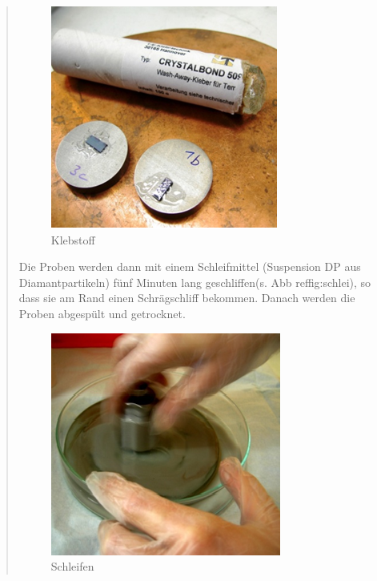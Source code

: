 \begin{quote}
    		\begin{figure}[H]
				\hspace{4.1 cm}
                  \includegraphics[scale=1, trim = 0cm 0cm 0cm 0cm,clip]
                	{./HerstellungBilder/KlebstoffunddieProben.png}
                  \caption{Klebstoff}
                \label{fig:kleb}
            \end{figure}

    		\vspace{2em}

    		Die Proben werden dann mit einem Schleifmittel (Suspension DP aus
    		Diamantpartikeln) fünf Minuten lang geschliffen(s.
    		Abb ref{fig:schlei}), so dass sie am Rand einen Schrägschliff
    		bekommen. Danach werden die Proben abgespült und getrocknet.

   			\vspace{2em}

    		\begin{figure}[H]
				\hspace{4.1 cm}
                  \includegraphics[scale=1, trim = 0cm 0cm 0cm 0cm,clip]
                	{./HerstellungBilder/Schleifen.png}
                  \caption{Schleifen}
                \label{fig:schlei}
            \end{figure}


\end{quote}
